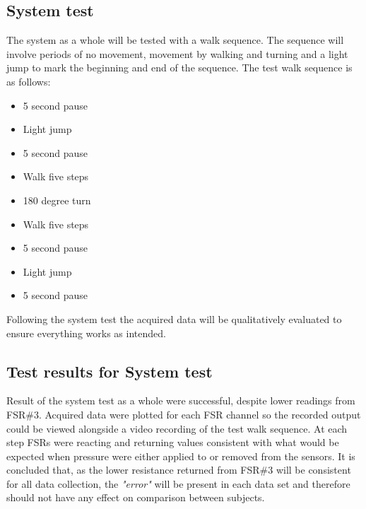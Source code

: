 \subsection{System test}
The system as a whole will be tested with a walk sequence. The sequence will involve periods of no movement, movement by walking and turning and a light jump to mark the beginning and end of the sequence. The test walk sequence is as follows:
\vspace{-0.6cm}
\begin{itemize}
	\item 5 second pause
	\vspace{-0.3cm}
	\item Light jump
	\vspace{-0.3cm}
	\item 5 second pause
	\vspace{-0.3cm}
	\item Walk five steps
	\vspace{-0.3cm}
	\item 180 degree turn
	\vspace{-0.3cm}
	\item Walk five steps
	\vspace{-0.3cm}
	\item 5 second pause
	\vspace{-0.3cm}
	\item Light jump
	\vspace{-0.3cm}
	\item 5 second pause
\end{itemize}
\vspace{-0.4cm}
Following the system test the acquired data will be qualitatively evaluated to ensure everything works as intended. 

\subsection{Test results for System test}
Result of the system test as a whole were successful, despite lower readings from FSR\#3. Acquired data were plotted for each FSR channel so the recorded output could be viewed alongside a video recording of the test walk sequence. At each step FSRs were reacting and returning values consistent with what would be expected when pressure were either applied to or removed from the sensors. 
It is concluded that, as the lower resistance returned from FSR\#3 will be consistent for all data collection, the \textit{"error"} will be present in each data set and therefore should not have any effect on comparison between subjects. 

